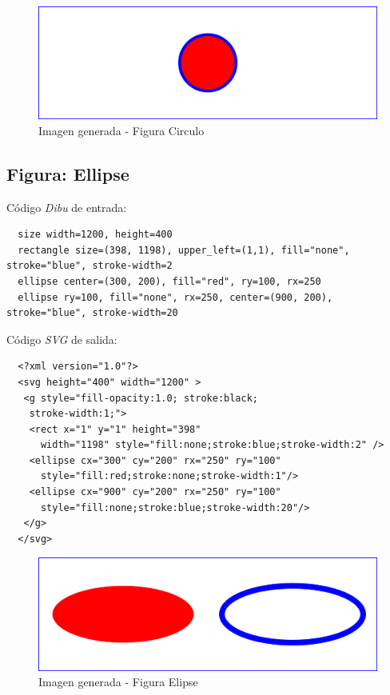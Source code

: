 \begin{figure}[H]
\centering
\includegraphics[width=150mm]{imagenes/circle.jpg}
\caption{Imagen generada - Figura Circulo}
\end{figure}

\subsection{\textbf{Figura:} Ellipse}

Código \textit{Dibu} de entrada:

\begin{lstlisting}
  size width=1200, height=400
  rectangle size=(398, 1198), upper_left=(1,1), fill="none", stroke="blue", stroke-width=2
  ellipse center=(300, 200), fill="red", ry=100, rx=250
  ellipse ry=100, fill="none", rx=250, center=(900, 200), stroke="blue", stroke-width=20
\end{lstlisting}

Código \textit{SVG} de salida:

\begin{lstlisting}
  <?xml version="1.0"?>
  <svg height="400" width="1200" >
   <g style="fill-opacity:1.0; stroke:black;
    stroke-width:1;">
    <rect x="1" y="1" height="398"
      width="1198" style="fill:none;stroke:blue;stroke-width:2" />
    <ellipse cx="300" cy="200" rx="250" ry="100"
      style="fill:red;stroke:none;stroke-width:1"/>
    <ellipse cx="900" cy="200" rx="250" ry="100"
      style="fill:none;stroke:blue;stroke-width:20"/>
   </g>
  </svg>
\end{lstlisting}

\begin{figure}[H]
\centering
\includegraphics[width=150mm]{imagenes/ellipse.jpg}
\caption{Imagen generada - Figura Elipse}
\end{figure}

